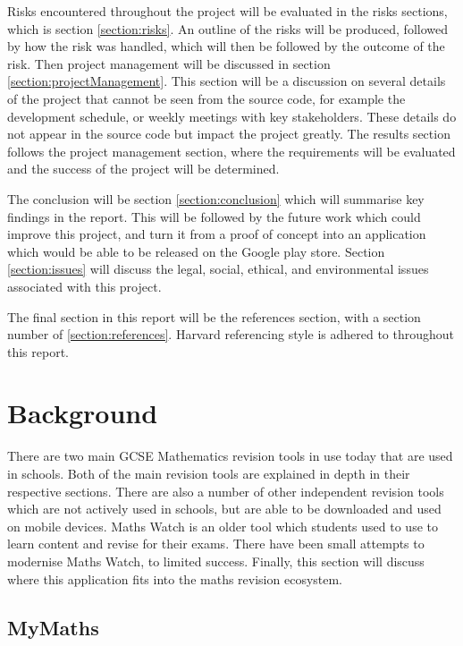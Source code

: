 \documentclass{article}
\begin{document}
Risks encountered throughout the project will be evaluated in the risks sections, which is section \ref{section:risks}. An outline of the risks will be produced, followed by how the risk was handled, which will then be followed by the outcome of the risk. Then project management will be discussed in section \ref{section:projectManagement}. This section will be a discussion on several details of the project that cannot be seen from the source code, for example the development schedule, or weekly meetings with key stakeholders. These details do not appear in the source code but impact the project greatly. The results section follows the project management section, where the requirements will be evaluated and the success of the project will be determined. \par

The conclusion will be section \ref{section:conclusion} which will summarise key findings in the report. This will be followed by the future work which could improve this project, and turn it from a proof of concept into an application which would be able to be released on the Google play store. Section \ref{section:issues} will discuss the legal, social, ethical, and environmental issues associated with this project. \par

The final section in this report will be the references section, with a section number of \ref{section:references}. Harvard referencing style is adhered to throughout this report.\par

\section{Background}
\label{section:background}

There are two main GCSE Mathematics revision tools in use today that are used in schools. Both of the main revision tools are explained in depth in their respective sections. There are also a number of other independent revision tools which are not actively used in schools, but are able to be downloaded and used on mobile devices. Maths Watch is an older tool which students used to use to learn content and revise for their exams. There have been small attempts to modernise Maths Watch, to limited success. Finally, this section will discuss where this application fits into the maths revision ecosystem. \par

\subsection{MyMaths}
\end{document}
